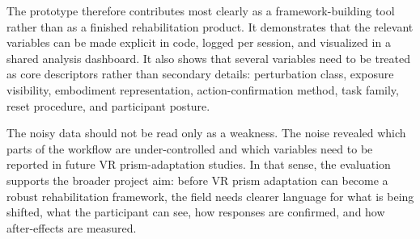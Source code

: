 The prototype therefore contributes most clearly as a framework-building tool rather than as a finished rehabilitation product. It demonstrates that the relevant variables can be made explicit in code, logged per session, and visualized in a shared analysis dashboard. It also shows that several variables need to be treated as core descriptors rather than secondary details: perturbation class, exposure visibility, embodiment representation, action-confirmation method, task family, reset procedure, and participant posture.

The noisy data should not be read only as a weakness. The noise revealed which parts of the workflow are under-controlled and which variables need to be reported in future VR prism-adaptation studies. In that sense, the evaluation supports the broader project aim: before VR prism adaptation can become a robust rehabilitation framework, the field needs clearer language for what is being shifted, what the participant can see, how responses are confirmed, and how after-effects are measured.
